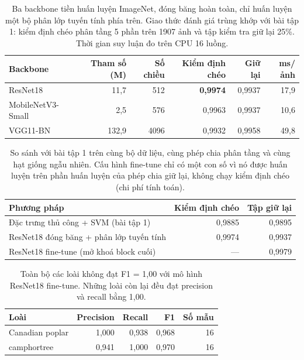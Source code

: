 \begin{table}[t]
\centering
\caption{Ba backbone tiền huấn luyện ImageNet, đóng băng hoàn toàn, chỉ huấn luyện một bộ phân lớp tuyến tính phía trên. Giao thức đánh giá trùng khớp với bài tập 1: kiểm định chéo phân tầng 5 phần trên 1907 ảnh và tập kiểm tra giữ lại 25\%. Thời gian suy luận đo trên CPU 16 luồng.}
\label{tab:backbones}
\small
\begin{tabular}{l r r r r r}
\toprule
Backbone & Tham số (M) & Số chiều & Kiểm định chéo & Giữ lại & ms/ảnh \\
\midrule
ResNet18 & 11{,}7 & 512 & \textbf{0{,}9974} & 0{,}9937 & 17{,}9 \\
MobileNetV3-Small & 2{,}5 & 576 & 0{,}9963 & 0{,}9937 & 10{,}6 \\
VGG11-BN & 132{,}9 & 4096 & 0{,}9932 & 0{,}9958 & 49{,}8 \\
\bottomrule
\end{tabular}
\end{table}

\begin{table}[t]
\centering
\caption{So sánh với bài tập 1 trên cùng bộ dữ liệu, cùng phép chia phân tầng và cùng hạt giống ngẫu nhiên. Cấu hình fine-tune chỉ có một con số vì nó được huấn luyện trên phần huấn luyện của phép chia giữ lại, không chạy kiểm định chéo (chi phí tính toán).}
\label{tab:comparison}
\small
\begin{tabular}{l r r}
\toprule
Phương pháp & Kiểm định chéo & Tập giữ lại \\
\midrule
Đặc trưng thủ công + SVM (bài tập 1) & 0{,}9885 & 0,9895 \\
ResNet18 đóng băng + phân lớp tuyến tính & 0{,}9974 & 0{,}9937 \\
ResNet18 fine-tune (mở khoá block cuối) & --- & 0{,}9979 \\
\bottomrule
\end{tabular}
\end{table}

\begin{table}[t]
\centering
\caption{Toàn bộ các loài không đạt F1 = 1,00 với mô hình ResNet18 fine-tune. Những loài còn lại đều đạt precision và recall bằng 1,00.}
\label{tab:perclass}
\small
\begin{tabular}{l r r r r}
\toprule
Loài & Precision & Recall & F1 & Số mẫu \\
\midrule
Canadian poplar & 1{,}000 & 0{,}938 & 0{,}968 & 16 \\
camphortree & 0{,}941 & 1{,}000 & 0{,}970 & 16 \\
\bottomrule
\end{tabular}
\end{table}

